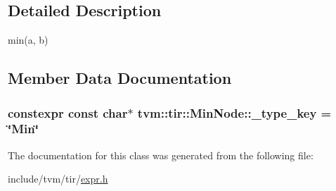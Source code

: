 \subsection{Detailed Description}
min(a, b) 

\subsection{Member Data Documentation}
\subsubsection[{\texorpdfstring{\+\_\+type\+\_\+key}{_type_key}}]{\setlength{\rightskip}{0pt plus 5cm}constexpr const char$\ast$ tvm\+::tir\+::\+Min\+Node\+::\+\_\+type\+\_\+key = \char`\"{}Min\char`\"{}\hspace{0.3cm}{\ttfamily [static]}}\hypertarget{classtvm_1_1tir_1_1MinNode_a5359dfe036d6b7131689e59a7e5cd641}{}\label{classtvm_1_1tir_1_1MinNode_a5359dfe036d6b7131689e59a7e5cd641}


The documentation for this class was generated from the following file\+:\begin{DoxyCompactItemize}
\item 
include/tvm/tir/\hyperlink{tir_2expr_8h}{expr.\+h}\end{DoxyCompactItemize}
